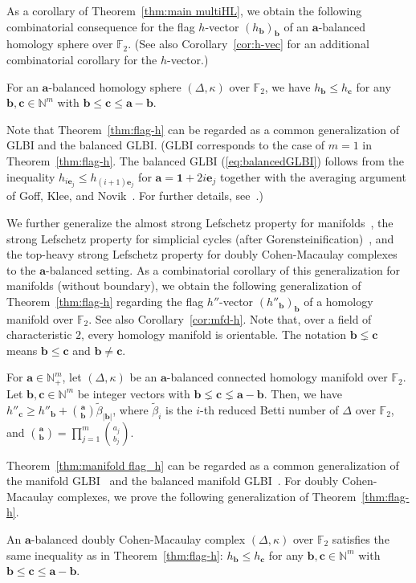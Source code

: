 As a corollary of Theorem~\ref{thm:main multiHL}, we obtain the following combinatorial consequence for the flag $h$-vector $(h_{\bm{b}})_{\bm{b}}$ of an $\bm{a}$-balanced homology sphere over $\mathbb{F}_2$. (See also Corollary~\ref{cor:h-vec} for an additional combinatorial corollary for the $h$-vector.)
\begin{theorem} \label{thm:flag-h}
For an $\bm{a}$-balanced homology sphere $(\Delta,\kappa)$ over $\mathbb{F}_2$, we have $h_{\bm{b}} \leq h_{\bm{c}}$ for any $\bm{b},\bm{c} \in \mathbb{N}^m$ with $\bm{b} \leq \bm{c} \leq \bm{a}-\bm{b}$.
\end{theorem}
Note that Theorem~\ref{thm:flag-h} can be regarded as a common generalization of GLBI and the balanced GLBI. (GLBI corresponds to the case of $m=1$ in Theorem~\ref{thm:flag-h}. The balanced GLBI (\ref{eq:balancedGLBI}) follows from the inequality $h_{i\bm{e}_j}\leq h_{(i+1)\bm{e}_j}$ for $\bm{a}=\bm{1}+2i\bm{e}_j$ together with the averaging argument of Goff, Klee, and Novik~\cite{GKN}. For further details, see~\cite{Adi17,JM}.)

We further generalize the almost strong Lefschetz property for manifolds~\cite[Section 8]{AY}, the strong Lefschetz property for simplicial cycles (after Gorensteinification)~\cite[Theorem I]{APP}, and the top-heavy strong Lefschetz property for doubly Cohen-Macaulay complexes~\cite[Corollary 3.2]{APP} to the $\bm{a}$-balanced setting.
As a combinatorial corollary of this generalization for manifolds (without boundary), we obtain the following generalization of Theorem~\ref{thm:flag-h} regarding the flag $h''$-vector $(h''_{\bm{b}})_{\bm{b}}$ of a homology manifold over $\mathbb{F}_2$. See also Corollary~\ref{cor:mfd-h}. Note that, over a field of characteristic $2$, every homology manifold is orientable.
The notation $\bm{b} \lneq \bm{c}$ means $\bm{b} \leq \bm{c}$ and $\bm{b} \neq \bm{c}$.
\begin{theorem} \label{thm:manifold flag_h}
For $\bm{a} \in \mathbb{N}^m_+$, let $(\Delta,\kappa)$ be an $\bm{a}$-balanced connected homology manifold over $\mathbb{F}_2$.
Let $\bm{b}, \bm{c} \in \mathbb{N}^m$ be integer vectors with $\bm{b} \lneq \bm{c} \lneq \bm{a}-\bm{b}$.
Then, we have $h''_{\bm{c}} \geq h''_{\bm{b}}+ \binom{\bm{a}}{\bm{b}}\widetilde{\beta}_{|\bm{b}|}$, where $\widetilde{\beta}_i$ is the $i$-th reduced Betti number of $\Delta$ over $\mathbb{F}_2$, and $\binom{\bm{a}}{\bm{b}}=\prod_{j=1}^m \binom{a_j}{b_j}$.
\end{theorem}
Theorem~\ref{thm:manifold flag_h} can be regarded as a common generalization of the manifold GLBI~\cite{NS} and the balanced manifold GLBI~\cite{JMNS}.
For doubly Cohen-Macaulay complexes, we prove the following generalization of Theorem~\ref{thm:flag-h}.
\begin{theorem} \label{thm:2CM_flag h}
An $\bm{a}$-balanced doubly Cohen-Macaulay complex $(\Delta,\kappa)$ over $\mathbb{F}_2$ satisfies the same inequality as in Theorem~\ref{thm:flag-h}: $h_{\bm{b}} \leq h_{\bm{c}}$ for any $\bm{b},\bm{c} \in \mathbb{N}^m$ with $\bm{b} \leq \bm{c} \leq \bm{a}-\bm{b}$.
\end{theorem}

